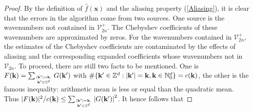 \documentclass[article]{siamltex}
\def\bx{\boldsymbol x}
\def\bk{{\bf k}}
\def\calV {\mathcal {V}}
\newcommand{\Z}{{\mathbb Z}}
\newcommand{\N}{\mathbb{N}}
\newcommand{\abs}[1]{\left\vert#1\right\vert}
\begin{document}
 \begin{proof} By the definition of
$\hat{f}(\bx)$ and the aliasing property (\ref{Aliasing}), it is
clear that the errors in the algorithm come from two sources. One
source is the wavenumbers not contained in ${\calV}_{2n}^+$. The
Chebyshev coefficients of these wavenumbers are approximated by
zeros. For the wavenumbers contained in ${\calV}_{2n}^+$, the
estimates of the Chebyshev coefficients are contaminated by the
effects of aliasing and the corresponding expanded coefficients whose wavenumbers not in ${\calV}_{2n}$. To proceed, there are still two facts to be  mentioned. One is  $F(\bk)=\sum_{|\bk'|=\bk,\atop\bk'\in {\Z}^d }{G(\bk')}$ with  $\#\{\bk'\in {\Z}^d : |\bk'|=\bk,\bk\in {\N}^d_{0}\}=c(\bk)$, the other is   the famous inequality: arithmetic mean is less or equal than the quadratic mean. Thus  $|F(\bk)|^2/c(\bk) \le \sum_{|\bk'|=\bk,\atop\bk'\in {\Z}^d }\abs{G(\bk')}^2$.  It hence follows that


\end{proof}
\end{document}
